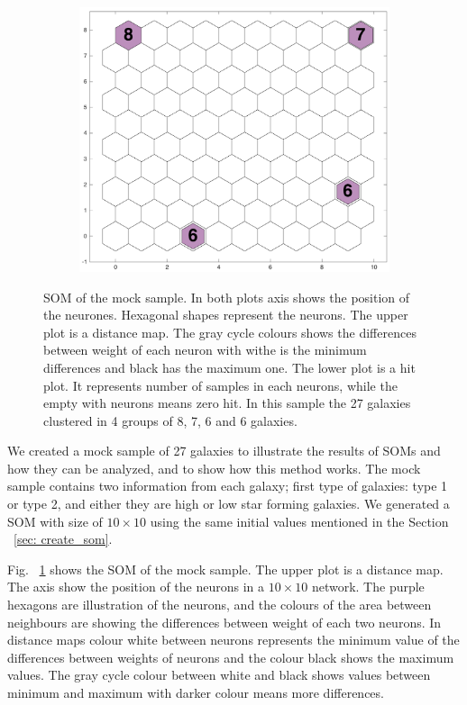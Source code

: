 \begin{figure}
\begin{subfigure}[b]{0.5\textwidth}
                \includegraphics[width=\textwidth]{../images0.01/sample/sample2_hits.png}
            \end{subfigure}
            \caption{SOM of the mock sample. In both plots axis shows the position of the neurones. Hexagonal shapes represent the neurons. The upper plot is a distance map. The gray cycle colours shows the differences between weight of each neuron with withe is the minimum differences and black has the maximum one. The lower plot is a hit plot. It represents number of samples in each neurons, while the empty with neurons means zero hit. In this sample the 27 galaxies clustered in 4 groups of 8, 7, 6 and 6 galaxies.}
            \label{fig: sample}
        \end{figure}
 
 We created  a mock sample of 27 galaxies to illustrate the results of SOMs and how they can be analyzed, and to show how this method works.
 The mock sample contains two information from each galaxy; first type of galaxies: type 1 or type 2, and either they are high or low star forming galaxies.
 We generated a SOM with size of $10 \times 10$ using the same initial values mentioned in the Section ~\ref{sec: create_som}.

 Fig. ~\ref{fig: sample} shows the SOM of the mock sample. 
 The upper plot is a distance map. 
 The axis show the position of the neurons in a $10 \times 10$ network. 
 The purple hexagons are illustration of the neurons, and the colours of the area between neighbours are showing the differences between weight of each two neurons.
 In distance maps colour white between neurons represents the minimum value of the differences between weights of neurons and the colour black shows the maximum values. 
 The gray cycle colour between white and black shows values between minimum and maximum with darker colour means more differences.
 
